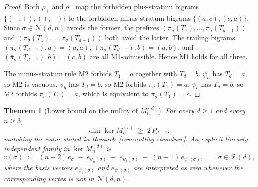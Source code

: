 \documentclass{amsart}
\newtheorem{theorem}{Theorem}[section]
\theoremstyle{definition}
\theoremstyle{remark}
\begin{document}
\begin{proof}
Both $\rho_+$ and $\rho_-$ map the forbidden plus-stratum
bigrams $\{(-,+), (+,-)\}$ to the forbidden minus-stratum
bigrams $\{(a,c), (c,a)\}$.  Since $\sigma \in \mathcal{N}(d, n)$
avoids the former, the prefixes
$(\pi_\sigma(T_1), \ldots, \pi_\sigma(T_{d-1}))$ and
$(\bar\pi_\sigma(T_1), \ldots, \bar\pi_\sigma(T_{d-1}))$ both
avoid the latter.  The trailing bigrams
$(\pi_\sigma(T_{d-1}), a) = (a, a)$,
$(\pi_\sigma(T_{d-1}), b) = (a, b)$, and
$(\bar\pi_\sigma(T_{d-1}), b) = (c, b)$ are all
M1-admissible.  Hence M1 holds for all three.

The minus-stratum rule M2 forbids $T_1 = a$ together with
$T_d = b$.  $\psi_a$ has $T_d = a$, so M2 is vacuous.
$\psi_b$ has $T_d = b$, so M2 forbids $\pi_\sigma(T_1) = a$.
$\psi_c$ has $T_d = b$, so M2 forbids $\bar\pi_\sigma(T_1) = a$,
which is equivalent to $\pi_\sigma(T_1) = c$.
\end{proof}

\begin{theorem}[Lower bound on the nullity of $M_n^{(d)}$]
\label{thm:nullity-lower}
For every $d \ge 1$ and every $n \ge 3$,
\begin{equation}\label{eq:nullity-lower}
  \dim \ker M_n^{(d)}
  \;\ge\; 2\,P_{d-1},
\end{equation}
matching the value stated in
Remark~\ref{rem:nullity-structure}.  An explicit linearly
independent family in $\ker M_n^{(d)}$ is
\begin{equation}\label{eq:v-sigma}
  v(\sigma) \;:=\; (n-2)\,e_\sigma
                   \;-\; e_{\psi_a(\sigma)}
                   \;-\; e_{\psi_b(\sigma)}
                   \;+\; (n-1)\,e_{\psi_c(\sigma)},
  \qquad \sigma \in \mathcal{F}(d),
\end{equation}
where the basis vectors $e_{\psi_b(\sigma)}$ and
$e_{\psi_c(\sigma)}$ are interpreted as zero whenever the
corresponding vertex is not in $\mathcal{N}(d, n)$.
\end{theorem}
\end{document}
